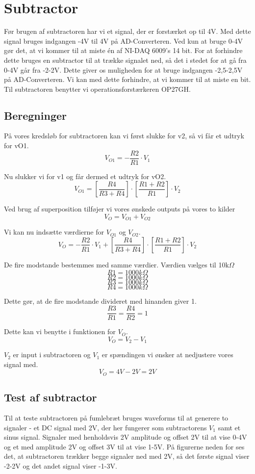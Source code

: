 \section{Subtractor}
Før brugen af subtractoren har vi et signal, der er forstærket op til 4V. Med dette signal bruges indgangen -4V til 4V på AD-Converteren. Ved kun at bruge 0-4V gør det, at vi kommer til at miste én af NI-DAQ 6009's 14 bit. For at forhindre dette bruges en subtractor til at trække signalet ned, så det i stedet for at gå fra 0-4V går fra -2-2V. Dette giver os muligheden for at bruge indgangen -2,5-2,5V på AD-Converteren. Vi kan med dette forhindre, at vi kommer til at miste en bit. Til subtractoren benytter vi operationsforstærkeren OP27GH.

\subsection{Beregninger}
\vspace{0.2cm}
På vores kredsløb for subtractoren kan vi først slukke for v2, så vi får et udtryk for vO1.
\[ V_{O1}=-\frac{R2}{R1}\cdot V_{1} \]

Nu slukker vi for v1 og får dermed et udtryk for vO2.
\[ V_{O1}=[\frac{R4}{R3+R4}]\cdot [\frac{R1+R2}{R1}] \cdot V_{2} \]

Ved brug af superposition tilføjer vi vores ønskede outputs på vores to kilder
\[ V_{O}=V_{O1}+V_{O2} \]

Vi kan nu indsætte værdierne for $V_{O1}$ og $V_{O2}$. 
\[ V_{O}=-\frac{R2}{R1}\cdot V_{1}+[\frac{R4}{R3+R4}]\cdot [\frac{R1+R2}{R1}] \cdot V_{2} \]

De fire modstande bestemmes med samme værdier. Værdien vælges til 10k$\Omega$
\[ R1=1000k\Omega \]
\[ R2=1000k\Omega \]
\[ R3=1000k\Omega \]
\[ R4=1000k\Omega \]

Dette gør, at de fire modstande divideret med hinanden giver 1.
\[ \frac{R3}{R1}=\frac{R4}{R2} = 1 \]

Dette kan vi benytte i funktionen for $V_{O}.$
\[ V_{O}=V_{2}-V_{1} \]

$V_{2}$ er input i subtractoren og $V_{1}$ er spændingen vi ønsker at nedjustere vores signal med.
\[ V_{O}=4V-2V=2V \]

\clearpage

\subsection{Test af subtractor}
Til at teste subtractoren på fumlebræt bruges waveforms til at generere to signaler - et DC signal med 2V, der her fungerer som subtractorens $V_{1}$ samt et sinus signal. Signaler med henholdsvis 2V amplitude og offset 2V til at vise 0-4V og et med amplitude 2V og offset 3V til at vise 1-5V. På figurerne neden for ses det, at subtractoren trækker begge signaler ned med 2V, så det første signal viser -2-2V og det andet signal viser -1-3V.

